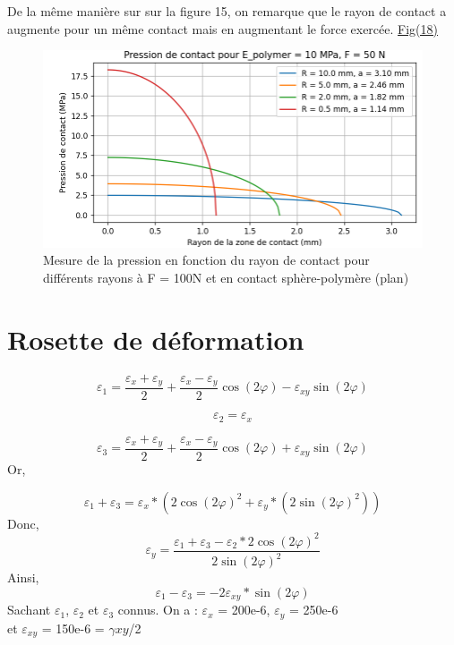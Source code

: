 \documentclass[a4paper,12pt]{article}
\begin{document}
De la même manière sur sur la figure 15, on remarque que le rayon de contact a augmente pour un même contact mais en augmentant le force exercée. \hyperref[fig:mon_image18]{Fig(18)}
\begin{figure}[H] 
	\centering
	\includegraphics[width=1\textwidth]{pre3.png} 
	\caption{Mesure de la pression en fonction du rayon de contact pour différents rayons à F = 100N et en contact sphère-polymère (plan)} 
	\label{fig:mon_image18} 
\end{figure}
\section{Rosette de déformation}

\begin{equation}
	\varepsilon_1 = \frac{\varepsilon_x + \varepsilon_y}{2} + \frac{\varepsilon_x - \varepsilon_y}{2} \cos(2\varphi) - \varepsilon_{xy} \sin(2\varphi)
	\label{eq:12}
\end{equation}

\begin{equation}
	\varepsilon_2 = \varepsilon_x 
	\label{eq:13}
\end{equation}

\begin{equation}
	\varepsilon_3 = \frac{\varepsilon_x + \varepsilon_y}{2} + \frac{\varepsilon_x - \varepsilon_y}{2} \cos(2\varphi) + \varepsilon_{xy} \sin(2\varphi)
	\label{eq:14}
\end{equation}
Or,

\begin{equation}
	\varepsilon_1 + \varepsilon_3 = \varepsilon_x * (2 \cos(2\varphi)^2 + \varepsilon_y *(2\sin(2\varphi)^2))
	\label{eq:15}
\end{equation}
Donc,
\begin{equation}
	\varepsilon_y =  \frac{\varepsilon_1 + \varepsilon_3 - \varepsilon_2 * 2 \cos(2\varphi)^2}{2\sin(2\varphi)^2}
	\label{eq:16}
\end{equation}
Ainsi,
\begin{equation}
	\varepsilon_1 - \varepsilon_3 = -2 \varepsilon_{xy} *\sin(2\varphi)
	\label{eq:17}
\end{equation}
Sachant $\varepsilon_1$, $\varepsilon_2$ et $\varepsilon_3$ connus. On a : $\varepsilon_x$ = 200e-6, $\varepsilon_y$ = 250e-6 \\et $\varepsilon_{xy}$ = 150e-6 = $\gamma{xy}$/2 \\
\end{document}
